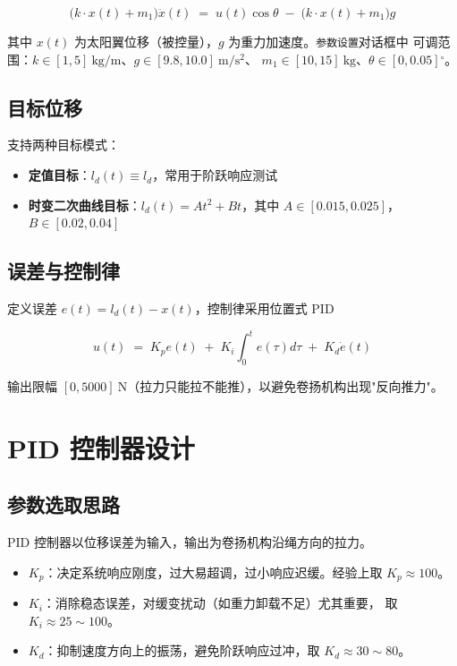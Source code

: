 \documentclass[UTF8, a4paper, fontset=none]{ctexart}
\begin{document}
\begin{equation}
\bigl( k \cdot x(t) + m_1 \bigr) \ddot{x}(t)
    \;=\; u(t) \cos\theta \;-\; \bigl( k \cdot x(t) + m_1 \bigr) g
\end{equation}

其中 $x(t)$ 为太阳翼位移（被控量），$g$ 为重力加速度。\texttt{参数设置}对话框中
可调范围：$k \in [1,5]\ \mathrm{kg/m}$、$g \in [9.8,10.0]\ \mathrm{m/s^2}$、
$m_1 \in [10,15]\ \mathrm{kg}$、$\theta \in [0,0.05]\!^\circ$。

\subsection{目标位移}

支持两种目标模式：

\begin{itemize}[leftmargin=*]
  \item \textbf{定值目标}：$l_d(t) \equiv l_d$，常用于阶跃响应测试
  \item \textbf{时变二次曲线目标}：$l_d(t) = A t^2 + B t$，其中
        $A \in [0.015, 0.025]$，$B \in [0.02, 0.04]$
\end{itemize}

\subsection{误差与控制律}

定义误差 $e(t) = l_d(t) - x(t)$，控制律采用位置式 PID

\begin{equation}
u(t) \;=\; K_p e(t) \;+\; K_i \int_0^t e(\tau) d\tau \;+\; K_d \dot{e}(t)
\end{equation}

输出限幅 $[0, 5000]\ \mathrm{N}$（拉力只能拉不能推），以避免卷扬机构出现"反向推力"。

\section{PID 控制器设计}

\subsection{参数选取思路}

PID 控制器以位移误差为输入，输出为卷扬机构沿绳方向的拉力。

\begin{itemize}[leftmargin=*]
  \item \textbf{$K_p$}：决定系统响应刚度，过大易超调，过小响应迟缓。经验上取
        $K_p \approx 100$。
  \item \textbf{$K_i$}：消除稳态误差，对缓变扰动（如重力卸载不足）尤其重要，
        取 $K_i \approx 25 \sim 100$。
  \item \textbf{$K_d$}：抑制速度方向上的振荡，避免阶跃响应过冲，取
        $K_d \approx 30 \sim 80$。
\end{itemize}
\end{document}

